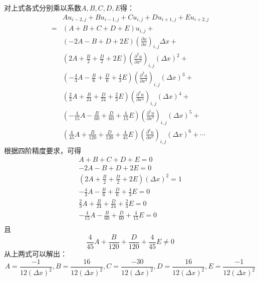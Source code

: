 对上式各式分别乘以系数$A,B,C,D,E$得：
\begin{equation}
\begin{aligned}
  &Au_{i-2,j}+Bu_{i-1,j}+Cu_{i,j}+Du_{i+1,j}+Eu_{i+2,j} 
  \\
  =
  &(A+B+C+D+E)u_{i,j}
  +
  \\
  &
  (-2A-B+D+2E)
  \left(
    \frac{\partial u}{\partial x}
  \right)_{i,j}
  \Delta x
  +
  \\
  &
  \left(2A+\frac{B}{2}+\frac{D}{2}+2E\right)
  \left(
    \frac{\partial^{2} u}{\partial x^{2}}
  \right)_{i,j}
  (\Delta x)^{2}
  +
  \\
  &
  \left(-\frac{4}{3}A-\frac{B}{6}+\frac{D}{6}+\frac{4}{3}E\right)
  \left(
    \frac{\partial^{3} u}{\partial x^{3}}
  \right)_{i,j}
  (\Delta x)^{3}
  +
  \\
  &
  \left(\frac{2}{3}A+\frac{B}{24}+\frac{D}{24}+\frac{2}{3}E\right)
  \left(
    \frac{\partial^{4} u}{\partial x^{4}}
  \right)_{i,j}
  (\Delta x)^{4}
  +
  \\
  &
  \left(-\frac{4}{15}A-\frac{B}{60}+\frac{D}{60}+\frac{4}{15}E\right)
  \left(
    \frac{\partial^{5} u}{\partial x^{5}}
  \right)_{i,j}
  (\Delta x)^{5}
  +
  \\
  &
  \left(\frac{4}{45}A+\frac{B}{120}+\frac{D}{120}+\frac{4}{45}E\right)
  \left(
    \frac{\partial^{6} u}{\partial x^{6}}
  \right)_{i,j}
  (\Delta x)^{6}
  +
  \cdots
\end{aligned}
\end{equation}
根据四阶精度要求，可得
\begin{equation}
  \begin{aligned}
    A+B+C+D+E = 0 \\
    -2A-B+D+2E = 0 \\
    \left(2A+\frac{B}{2} + \frac{D}{2} + 2E\right)(\Delta x)^{2} = 1 \\
    -\frac{4}{3}A-\frac{B}{6}+\frac{D}{6}+\frac{4}{3}E = 0 \\
    \frac{2}{3}A+\frac{B}{24}+\frac{D}{24}+\frac{2}{3}E = 0 \\
    -\frac{4}{15}A-\frac{B}{60}+\frac{D}{60}+\frac{4}{15}E = 0 \\
  \end{aligned}
\end{equation}
且
\begin{equation}
    \frac{4}{45}A+\frac{B}{120}+\frac{D}{120}+\frac{4}{45}E \neq 0
\end{equation}
从上两式可以解出：
\begin{equation}
  A = \frac{-1}{12(\Delta x)^{2}}
  ,
  B = \frac{16}{12(\Delta x)^{2}}
  ,
  C = \frac{-30}{12(\Delta x)^{2}}
  ,
  D = \frac{16}{12(\Delta x)^{2}}
  ,
  E = \frac{-1}{12(\Delta x)^{2}}
\end{equation}

